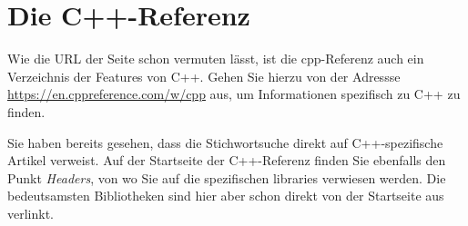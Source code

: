 \section{Die C++-Referenz}
\begin{plusbox}
Wie die URL der Seite schon vermuten lässt, ist die cpp-Referenz auch ein Verzeichnis der Features von C++. Gehen Sie hierzu von der Adressse \url{https://en.cppreference.com/w/cpp} aus, um Informationen spezifisch zu C++ zu finden.

Sie haben bereits gesehen, dass die Stichwortsuche direkt auf C++-spezifische Artikel verweist. Auf der Startseite der C++-Referenz finden Sie ebenfalls den Punkt \emph{Headers}, von wo Sie auf die spezifischen libraries verwiesen werden. Die bedeutsamsten Bibliotheken sind hier aber schon direkt von der Startseite aus verlinkt.
\end{plusbox}
